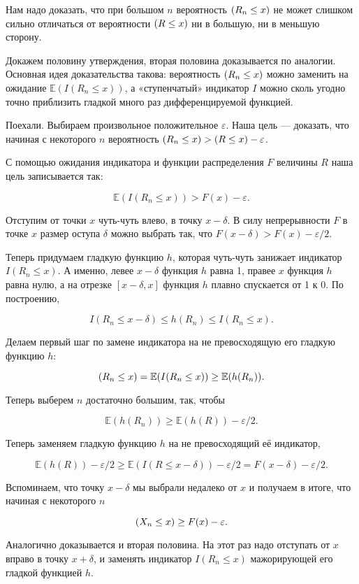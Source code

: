 \documentclass[
  letterpaper,
  DIV=11,
  numbers=noendperiod]{scrartcl}
\let\P\relax
\newcommand\P{{\mathbb{P}}}
\newcommand\E{{\mathbb{E}}}
\begin{document}
\begin{tcolorbox}[enhanced jigsaw, breakable, colbacktitle=quarto-callout-caution-color!10!white, opacitybacktitle=0.6, colback=white, bottomrule=.15mm, arc=.35mm, title=\textcolor{quarto-callout-caution-color}{\faFire}\hspace{0.5em}{Доказательство леммы}, leftrule=.75mm, rightrule=.15mm, opacityback=0, left=2mm, toptitle=1mm, bottomtitle=1mm, colframe=quarto-callout-caution-color-frame, titlerule=0mm, coltitle=black, toprule=.15mm]
Нам надо доказать, что при большом \(n\) вероятность \(\P(R_n\leq x)\)
не может слишком сильно отличаться от вероятности \(\P(R \leq x)\) ни в
большую, ни в меньшую сторону.

Докажем половину утверждения, вторая половина доказывается по аналогии.
Основная идея доказательства такова: вероятность \(\P(R_n \leq x)\)
можно заменить на ожидание \(\E(I(R_n \leq x))\), а «ступенчатый»
индикатор \(I\) можно сколь угодно точно приблизить гладкой много раз
дифференцируемой функцией.

Поехали. Выбираем произвольное положительное \(\varepsilon\). Наша цель
--- доказать, что начиная с некоторого \(n\) вероятность
\(\P(R_n \leq x) > \P(R \leq x) - \varepsilon\).

С помощью ожидания индикатора и функции распределения \(F\) величины
\(R\) наша цель записывается так:

\[
\E(I(R_n \leq x)) > F(x) - \varepsilon.
\]

Отступим от точки \(x\) чуть-чуть влево, в точку \(x - \delta\). В силу
непрерывности \(F\) в точке \(x\) размер оступа \(\delta\) можно выбрать
так, что \(F(x-\delta) > F(x) - \varepsilon/2\).

Теперь придумаем гладкую функцию \(h\), которая чуть-чуть занижает
индикатор \(I(R_n \leq x)\). А именно, левее \(x-\delta\) функция \(h\)
равна 1, правее \(x\) функция \(h\) равна нулю, а на отрезке
\([x-\delta, x]\) функция \(h\) плавно спускается от 1 к 0. По
построению,

\[
I(R_n \leq x - \delta) \leq h(R_n) \leq I(R_n \leq x).
\]

Делаем первый шаг по замене индикатора на не превосходящую его гладкую
функцию \(h\):

\[
\P(R_n\leq x) = \E(I(R_n \leq x)) \geq \E(h(R_n)).
\]

Теперь выберем \(n\) достаточно большим, так, чтобы

\[
\E(h(R_n)) \geq \E(h(R)) - \varepsilon/2. 
\]

Теперь заменяем гладкую функцию \(h\) на не превосходящий её индикатор,

\[
\E(h(R)) - \varepsilon/2 \geq \E(I(R \leq x-\delta)) - \varepsilon/2 = F(x-\delta) - \varepsilon/2.
\]

Вспоминаем, что точку \(x-\delta\) мы выбрали недалеко от \(x\) и
получаем в итоге, что начиная с некоторого \(n\)

\[
\P(X_n \leq x) \geq F(x) - \varepsilon.
\]

Аналогично доказывается и вторая половина. На этот раз надо отступать от
\(x\) вправо в точку \(x+\delta\), и заменять индикатор
\(I(R_n \leq x)\) мажорирующей его гладкой функцией \(h\).
\end{tcolorbox}
\end{document}
